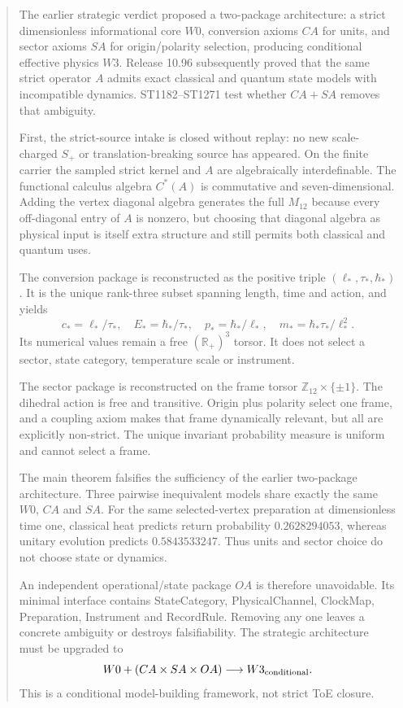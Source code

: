 \documentclass[11pt,a4paper]{article}
\begin{document}
\begin{abstract}
The earlier strategic verdict proposed a two-package architecture: a strict
dimensionless informational core $W0$, conversion axioms $CA$ for units, and
sector axioms $SA$ for origin/polarity selection, producing conditional
effective physics $W3$.  Release 10.96 subsequently proved that the same strict
operator $A$ admits exact classical and quantum state models with incompatible
dynamics.  ST1182--ST1271 test whether $CA+SA$ removes that ambiguity.

First, the strict-source intake is closed without replay: no new scale-charged
$S_+$ or translation-breaking source has appeared.  On the finite carrier the
sampled strict kernel and $A$ are algebraically interdefinable.  The functional
calculus algebra $C^*(A)$ is commutative and seven-dimensional.  Adding the
vertex diagonal algebra generates the full $M_{12}$ because every off-diagonal
entry of $A$ is nonzero, but choosing that diagonal algebra as physical input
is itself extra structure and still permits both classical and quantum uses.

The conversion package is reconstructed as the positive triple
$(\ell_*,\tau_*,\hbar_*)$.  It is the unique rank-three subset spanning length,
time and action, and yields
\[
c_*=\ell_*/\tau_*,\quad E_*=\hbar_*/\tau_*,\quad
p_*=\hbar_*/\ell_*,\quad m_*=\hbar_*\tau_*/\ell_*^2.
\]
Its numerical values remain a free $(\mathbb R_+)^3$ torsor.  It does not
select a sector, state category, temperature scale or instrument.

The sector package is reconstructed on the frame torsor
$\mathbb Z_{12}\times\{\pm1\}$.  The dihedral action is free and transitive.
Origin plus polarity select one frame, and a coupling axiom makes that frame
dynamically relevant, but all are explicitly non-strict.  The unique invariant
probability measure is uniform and cannot select a frame.

The main theorem falsifies the sufficiency of the earlier two-package
architecture.  Three pairwise inequivalent models share exactly the same
$W0$, $CA$ and $SA$.  For the same selected-vertex preparation at dimensionless
time one, classical heat predicts return probability $0.2628294053$, whereas
unitary evolution predicts $0.5843533247$.  Thus units and sector choice do not
choose state or dynamics.

An independent operational/state package $OA$ is therefore unavoidable.  Its
minimal interface contains StateCategory, PhysicalChannel, ClockMap,
Preparation, Instrument and RecordRule.  Removing any one leaves a concrete
ambiguity or destroys falsifiability.  The strategic architecture must be
upgraded to
\[
  W0+(CA\times SA\times OA)\longrightarrow W3_{\rm conditional}.
\]
This is a conditional model-building framework, not strict ToE closure.
\end{abstract}
\end{document}
